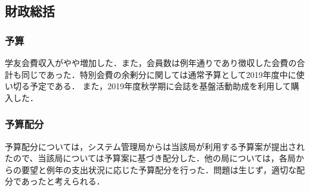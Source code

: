 \subsection*{財政総括}

\subsubsection*{予算}
学友会費収入がやや増加した．また，会員数は例年通りであり徴収した会費の合計も同じであった．特別会費の余剰分に関しては通常予算として2019年度中に使い切る予定である．
また，2019年度秋学期に会誌を基盤活動助成を利用して購入した．

\subsubsection*{予算配分}
予算配分については，システム管理局からは当該局が利用する予算案が提出されたので、当該局については予算案に基づき配分した．他の局については，各局からの要望と例年の支出状況に応じた予算配分を行った．問題は生じず，適切な配分であったと考えられる．